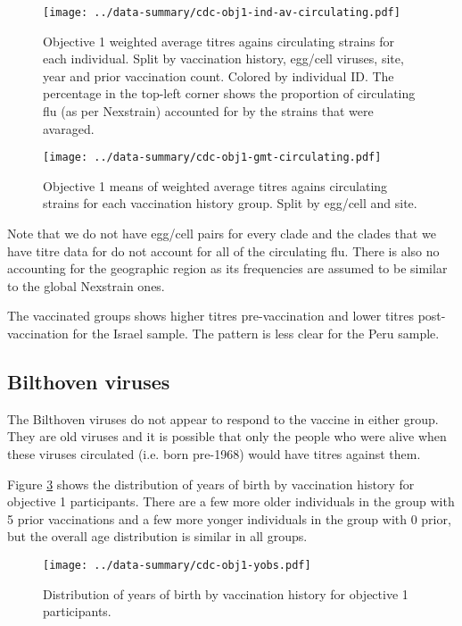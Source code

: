 \documentclass[12pt]{article}
\begin{document}
\begin{figure}
	\texttt{[image: ../data-summary/cdc-obj1-ind-av-circulating.pdf]}
	\caption{Objective 1 weighted average titres agains circulating strains for each individual. Split by vaccination history, egg/cell viruses, site, year and prior vaccination count. Colored by individual ID.  The percentage in the top-left corner shows the proportion of circulating flu (as per Nexstrain) accounted for by the strains that were avaraged.}
	\label{fig:cdc-obj1-ind-av-circulating}
\end{figure}

\begin{figure}
	\texttt{[image: ../data-summary/cdc-obj1-gmt-circulating.pdf]}
	\caption{Objective 1 means of weighted average titres agains circulating strains for each vaccination history group. Split by egg/cell and site.}
	\label{fig:cdc-obj1-gmt-circulating}
\end{figure}

Note that we do not have egg/cell pairs for every clade and the clades that we have titre data for do not account for all of the circulating flu. There is also no accounting for the geographic region as its frequencies are assumed to be similar to the global Nexstrain ones.

The vaccinated groups shows higher titres pre-vaccination and lower titres post-vaccination for the Israel sample. The pattern is less clear for the Peru sample.

\subsection{Bilthoven viruses}

The Bilthoven viruses do not appear to respond to the vaccine in either group.
They are old viruses and it is possible that only the people who were alive when
these viruses circulated (i.e. born pre-1968) would have titres against them.

Figure \ref{fig:cdc-obj1-yobs} shows the distribution of years of birth by vaccination history for objective 1 participants. There are a few more older individuals in the  group with 5 prior vaccinations and a few more yonger individuals in the  group with 0 prior, but the overall age distribution is similar in all groups.

\begin{figure}
	\texttt{[image: ../data-summary/cdc-obj1-yobs.pdf]}
	\caption{Distribution of years of birth by vaccination history for objective 1 participants.}
	\label{fig:cdc-obj1-yobs}
\end{figure}
\end{document}
